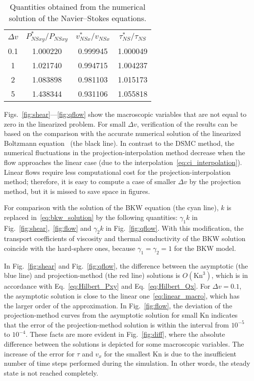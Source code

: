 \documentclass[]{elsarticle} %
\newcommand{\Kn}{\mathrm{Kn}}
\newcommand{\NS}{N\!S}
\newcommand{\OO}[1]{O(#1)}
\begin{document}
\begin{table}
    \centering
    \begin{tabular}{cccc}
        \(\Delta{v}\) & \(\displaystyle P_{\NS xy}^*/P_{\NS xy}\) & \(\displaystyle v_{\NS x}^*/v_{\NS x}\) & \(\displaystyle \tau_{\NS}^*/\tau_{\NS}\) \\[3pt]
        0.1 & 1.000220 & 0.999945 & 1.000049 \\
          1 & 1.021740 & 0.994715 & 1.004237 \\
          2 & 1.083898 & 0.981103 & 1.015173 \\
          5 & 1.438344 & 0.931106 & 1.055818 \\
    \end{tabular}
    \caption{Quantities obtained from the numerical solution of the Navier--Stokes equations.}
    \label{table:NS_params}
\end{table}

Figs.~\ref{fig:shear}---\ref{fig:qflow} show the macroscopic variables
that are not equal to zero in the linearized problem.
For small \(\Delta{v}\), verification of the results can be based
on the comparison with the accurate numerical solution of
the linearized Boltzmann equation~\citep{Ohwada1990} (the black line).
In contrast to the DSMC method, the numerical fluctuations in the projection-interpolation method
decrease when the flow approaches the linear case (due to the interpolation~\eqref{eq:ci_interpolation}).
Linear flows require less computational cost for the projection-interpolation method;
therefore, it is easy to compute a case of smaller \(\Delta{v}\) by the projection method,
but it is missed to save space in figures.

For comparison with the solution of the BKW equation (the cyan line),
\(k\) is replaced in~\eqref{eq:bkw_solution} by the following quantities:
\(\gamma_1k\) in Fig.~\ref{fig:shear},~\ref{fig:flow} and \(\gamma_2k\) in Fig.~\ref{fig:qflow}.
With this modification, the transport coefficients of viscosity and thermal conductivity
of the BKW solution coincide with the hard-sphere ones, because \(\gamma_1=\gamma_2=1\) for the BKW model.

In Fig.~\ref{fig:shear} and Fig.~\ref{fig:qflow}, the difference between the asymptotic (the blue line)
and projection-method (the red line) solutions is \(\OO{\Kn^3}\),
which is in accordance with Eq.~\eqref{eq:Hilbert_Pxy} and Eq.~\eqref{eq:Hilbert_Qx}.
For \(\Delta{v}=0.1\), the asymptotic solution is close to the linear one~\eqref{eq:linear_macro},
which has the larger order of the approximation.
In Fig.~\ref{fig:flow}, the deviation of the projection-method curves
from the asymptotic solution for small \(\Kn\) indicates that
the error of the projection-method solution is within the interval from \(10^{-5}\) to \(10^{-4}\).
These facts are more evident in Fig.~\ref{fig:diff},
where the absolute difference between the solutions
is depicted for some macroscopic variables.
The increase of the error for \(\tau\) and \(v_x\) for the smallest \(\Kn\)
is due to the insufficient number of time steps performed during the simulation.
In other words, the steady state is not reached completely.
\end{document}
